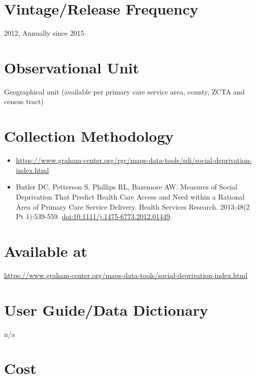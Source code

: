 \documentclass[
]{book}
\providecommand{\tightlist}{%
  \setlength{\itemsep}{0pt}\setlength{\parskip}{0pt}}
\begin{document}
\hypertarget{vintagerelease-frequency-79}{%
\section{Vintage/Release Frequency}\label{vintagerelease-frequency-79}}

2012, Annually since 2015

\hypertarget{observational-unit-79}{%
\section{Observational Unit}\label{observational-unit-79}}

Geographical unit (available per primary care service area, county, ZCTA and census tract)

\hypertarget{collection-methodology-79}{%
\section{Collection Methodology}\label{collection-methodology-79}}

\begin{itemize}
\tightlist
\item
  \url{https://www.graham-center.org/rgc/maps-data-tools/sdi/social-deprivation-index.html}
\item
  Butler DC, Petterson S, Phillips RL, Bazemore AW. Measures of Social Deprivation That Predict Health Care Access and Need within a Rational Area of Primary Care Service Delivery. Health Services Research. 2013;48(2 Pt 1):539-559. \url{doi:10.1111/j.1475-6773.2012.01449}.
\end{itemize}

\hypertarget{available-at-79}{%
\section{Available at}\label{available-at-79}}

\url{https://www.graham-center.org/maps-data-tools/social-deprivation-index.html}

\hypertarget{user-guidedata-dictionary-79}{%
\section{User Guide/Data Dictionary}\label{user-guidedata-dictionary-79}}

n/a

\hypertarget{cost-79}{%
\section{Cost}\label{cost-79}}
\end{document}
